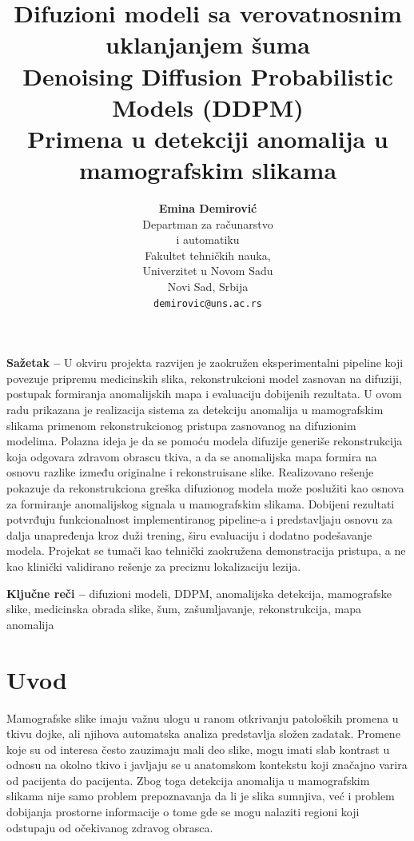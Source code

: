 \documentclass[10pt]{article}
\title{
	\textbf{\Large Difuzioni modeli sa verovatnosnim uklanjanjem šuma}\\
	\textbf{\large Denoising Diffusion Probabilistic Models (DDPM)}\\[0.03cm]
	\Large Primena u detekciji anomalija u mamografskim slikama\\[0.35cm]
}
\author{
	\hfill
	\begin{minipage}[t]{0.44\textwidth}
		\centering
		\textbf{Emina Demirović}\\
		Departman za računarstvo\\
		i automatiku\\
		Fakultet tehničkih nauka,\\
		Univerzitet u Novom Sadu\\
		Novi Sad, Srbija\\
		\texttt{demirovic@uns.ac.rs}
	\end{minipage}
}
\date{}
\begin{document}
	
	\maketitle
	\pagestyle{empty}
	
	\begin{center}
		\begin{minipage}{0.92\textwidth}
			\textbf{Sažetak --}
			U okviru projekta razvijen je zaokružen eksperimentalni pipeline koji povezuje pripremu medicinskih slika, rekonstrukcioni model zasnovan na difuziji, postupak formiranja anomalijskih mapa i evaluaciju dobijenih rezultata.
			U ovom radu prikazana je realizacija sistema za detekciju anomalija u mamografskim slikama primenom rekonstrukcionog pristupa zasnovanog na difuzionim modelima. Polazna ideja je da se pomoću modela difuzije generiše rekonstrukcija koja odgovara zdravom obrascu tkiva, a da se anomalijska mapa formira na osnovu razlike između originalne i rekonstruisane slike. Realizovano rešenje pokazuje da rekonstrukciona greška difuzionog modela može poslužiti kao osnova za formiranje anomalijskog signala u mamografskim slikama. Dobijeni rezultati potvrđuju funkcionalnost implementiranog pipeline-a i predstavljaju osnovu za dalja unapređenja kroz duži trening, širu evaluaciju i dodatno podešavanje modela. Projekat se tumači kao tehnički zaokružena demonstracija pristupa, a ne kao klinički validirano rešenje za preciznu lokalizaciju lezija.
			
			\vspace{0.3cm}
			
			\textbf{Ključne reči --}
			difuzioni modeli, DDPM, anomalijska detekcija, mamografske slike, medicinska obrada slike, šum, zašumljavanje, rekonstrukcija, mapa anomalija
			
		\end{minipage}
	\end{center}
	
	\vspace{0.4cm}
	
	\section{Uvod}
	Mamografske slike imaju važnu ulogu u ranom otkrivanju patoloških promena u tkivu dojke, ali njihova automatska analiza predstavlja složen zadatak. Promene koje su od interesa često zauzimaju mali deo slike, mogu imati slab kontrast u odnosu na okolno tkivo i javljaju se u anatomskom kontekstu koji značajno varira od pacijenta do pacijenta. Zbog toga detekcija anomalija u mamografskim slikama nije samo problem prepoznavanja da li je slika sumnjiva, već i problem dobijanja prostorne informacije o tome gde se mogu nalaziti regioni koji odstupaju od očekivanog zdravog obrasca.
	
\end{document}
